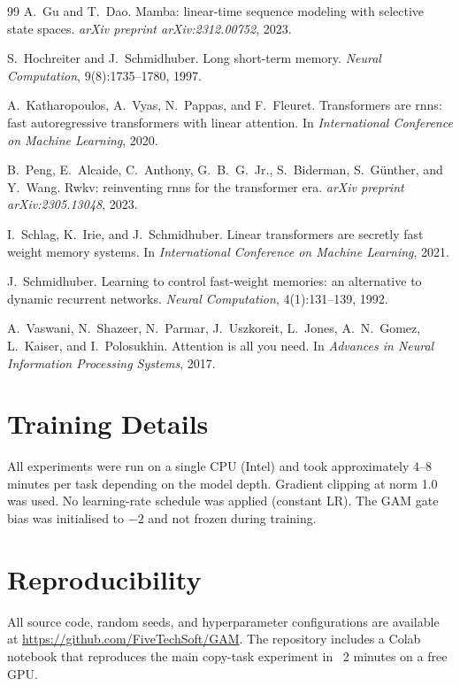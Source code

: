 \documentclass[11pt,a4paper]{article}
\begin{document}
\begin{thebibliography}{99}
A.~Gu and T.~Dao.
\newblock Mamba: linear-time sequence modeling with selective state spaces.
\newblock \emph{arXiv preprint arXiv:2312.00752}, 2023.

S.~Hochreiter and J.~Schmidhuber.
\newblock Long short-term memory.
\newblock \emph{Neural Computation}, 9(8):1735--1780, 1997.

A.~Katharopoulos, A.~Vyas, N.~Pappas, and F.~Fleuret.
\newblock Transformers are rnns: fast autoregressive transformers with linear
  attention.
\newblock In \emph{International Conference on Machine Learning}, 2020.

B.~Peng, E.~Alcaide, C.~Anthony, G.~B.~G.~Jr., S.~Biderman,
  S.~G{\"u}nther, and Y.~Wang.
\newblock Rwkv: reinventing rnns for the transformer era.
\newblock \emph{arXiv preprint arXiv:2305.13048}, 2023.

I.~Schlag, K.~Irie, and J.~Schmidhuber.
\newblock Linear transformers are secretly fast weight memory systems.
\newblock In \emph{International Conference on Machine Learning}, 2021.

J.~Schmidhuber.
\newblock Learning to control fast-weight memories: an alternative to dynamic
  recurrent networks.
\newblock \emph{Neural Computation}, 4(1):131--139, 1992.

A.~Vaswani, N.~Shazeer, N.~Parmar, J.~Uszkoreit, L.~Jones, A.~N.~Gomez,
  L.~Kaiser, and I.~Polosukhin.
\newblock Attention is all you need.
\newblock In \emph{Advances in Neural Information Processing Systems}, 2017.

\end{thebibliography}

\appendix
\section{Training Details}
\label{app:train}

All experiments were run on a single CPU (Intel) and took approximately
4--8 minutes per task depending on the model depth.  Gradient clipping
at norm 1.0 was used.  No learning-rate schedule was applied (constant
LR).  The GAM gate bias was initialised to $-2$ and not frozen during
training.

\section{Reproducibility}
\label{app:repro}

All source code, random seeds, and hyperparameter configurations are
available at \url{https://github.com/FiveTechSoft/GAM}.  The repository
includes a Colab notebook that reproduces the main copy-task experiment
in ~2 minutes on a free GPU.
\end{document}
